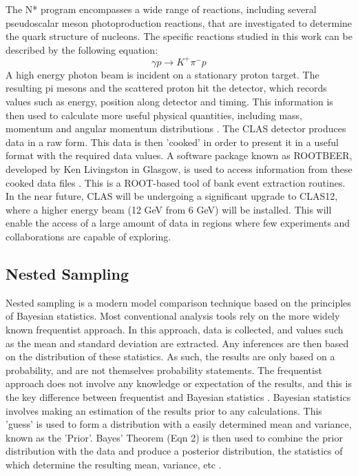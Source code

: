 \documentclass[a4paper,12pt]{article}
\begin{document}
The N* program encompasses a wide range of reactions, including several pseudoscalar meson photoproduction reactions, that are investigated to determine the quark structure of nucleons.  The specific reactions studied in this work can be described by the following equation:
\begin{equation}
 \gamma p \rightarrow K^{+} \pi^{-} p
\end{equation}
A high energy photon beam is incident on a stationary proton target.  The resulting pi mesons and the scattered proton hit the detector, which records values such as energy, position along detector and timing.  This information is then used to calculate more useful physical quantities, including mass, momentum and angular momentum distributions \cite{nstar}.  
\newline
The CLAS detector produces data in a raw form.  This data is then 'cooked' in order to present it in a useful format with the required data values.  A software package known as ROOTBEER, developed by Ken Livingston in Glasgow, is used to access information from these cooked data files \cite{rootbeer}.  This is a ROOT-based tool of bank event extraction routines.  
\newline
In the near future, CLAS will be undergoing a significant upgrade to CLAS12, where a higher energy beam (12 GeV from 6 GeV) will be installed.  This will enable the access of a large amount of data in regions where few experiments and collaborations are capable of exploring.  

\subsection{Nested Sampling}
Nested sampling is a modern model comparison technique based on the principles of Bayesian statistics.  Most conventional analysis tools rely on the more widely known frequentist approach. In this approach, data is collected, and values such as the mean and standard deviation are extracted.  Any inferences are then based on the distribution of these statistics.  As such, the results are only based on a probability, and are not themselves probability statements.  The frequentist approach does not involve any knowledge or expectation of the results, and this is the key difference between frequentist and Bayesian statistics \cite{bayes}.
\newline
Bayesian statistics involves making an estimation of the results prior to any calculations.  This 'guess' is used to form a distribution with a easily determined mean and variance, known as the 'Prior'.  Bayes' Theorem (Eqn 2) is then used to combine the prior distribution with the data and produce a posterior distribution, the statistics of which determine the resulting mean, variance, etc \cite{sivia}. 
\newline
\end{document}

